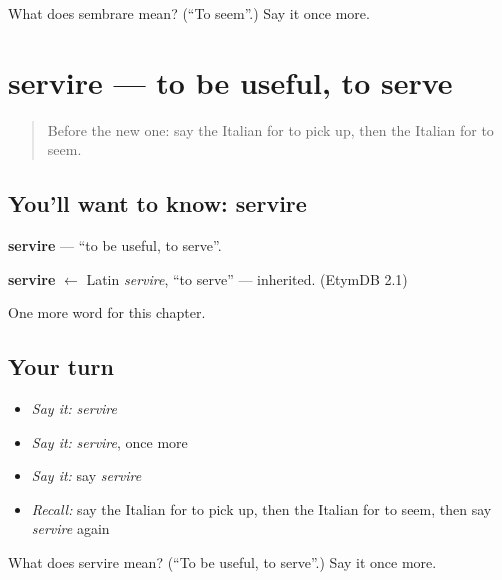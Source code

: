 \begin{tcolorbox}[breakable,colback=teal!4,colframe=teal!35!black,title={Before you move on}]
What does sembrare mean? (\textquotedblleft{}To seem\textquotedblright{}.) Say it once more.
\end{tcolorbox}
\section[servire]{servire — to be useful, to serve}

\label{lesson:IT-C211-servire}



\begin{quote}
Before the new one: say the Italian for to pick up, then the Italian for to seem.
\end{quote}

\subsection*{You'll want to know: servire}
\textbf{servire} — \textquotedblleft{}to be useful, to serve\textquotedblright{}.

\begin{cousinweb}
\textbf{servire} $\leftarrow$ Latin \emph{servire}, \textquotedblleft{}to serve\textquotedblright{} — inherited. (EtymDB 2.1)
\end{cousinweb}

\begin{grammarlens}[title={What you've built}]
One more word for this chapter.
\end{grammarlens}

\subsection*{Your turn}
\begin{itemize}
\raggedright
  \item \emph{Say it:} \emph{servire}
  \item \emph{Say it:} \emph{servire}, once more
  \item \emph{Say it:} say \emph{servire}
  \item \emph{Recall:} say the Italian for to pick up, then the Italian for to seem, then say \emph{servire} again
\end{itemize}

\begin{tcolorbox}[breakable,colback=teal!4,colframe=teal!35!black,title={Before you move on}]
What does servire mean? (\textquotedblleft{}To be useful, to serve\textquotedblright{}.) Say it once more.
\end{tcolorbox}

